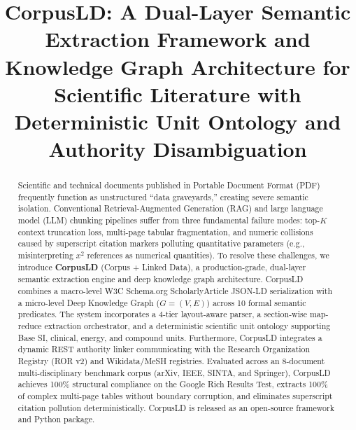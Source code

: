 \documentclass[conference]{IEEEtran}
\begin{document}
\title{CorpusLD: A Dual-Layer Semantic Extraction Framework and Knowledge Graph Architecture for Scientific Literature with Deterministic Unit Ontology and Authority Disambiguation}

\author{
}

\maketitle

\begin{abstract}
Scientific and technical documents published in Portable Document Format (PDF) frequently function as unstructured ``data graveyards,'' creating severe semantic isolation. Conventional Retrieval-Augmented Generation (RAG) and large language model (LLM) chunking pipelines suffer from three fundamental failure modes: top-$K$ context truncation loss, multi-page tabular fragmentation, and numeric collisions caused by superscript citation markers polluting quantitative parameters (e.g., misinterpreting $x^2$ references as numerical quantities). To resolve these challenges, we introduce \textbf{CorpusLD} (Corpus + Linked Data), a production-grade, dual-layer semantic extraction engine and deep knowledge graph architecture. CorpusLD combines a macro-level W3C Schema.org ScholarlyArticle JSON-LD serialization with a micro-level Deep Knowledge Graph ($G = (V, E)$) across 10 formal semantic predicates. The system incorporates a 4-tier layout-aware parser, a section-wise map-reduce extraction orchestrator, and a deterministic scientific unit ontology supporting Base SI, clinical, energy, and compound units. Furthermore, CorpusLD integrates a dynamic REST authority linker communicating with the Research Organization Registry (ROR v2) and Wikidata/MeSH registries. Evaluated across an 8-document multi-disciplinary benchmark corpus (arXiv, IEEE, SINTA, and Springer), CorpusLD achieves 100\% structural compliance on the Google Rich Results Test, extracts 100\% of complex multi-page tables without boundary corruption, and eliminates superscript citation pollution deterministically. CorpusLD is released as an open-source framework and Python package.
\end{abstract}
\end{document}
